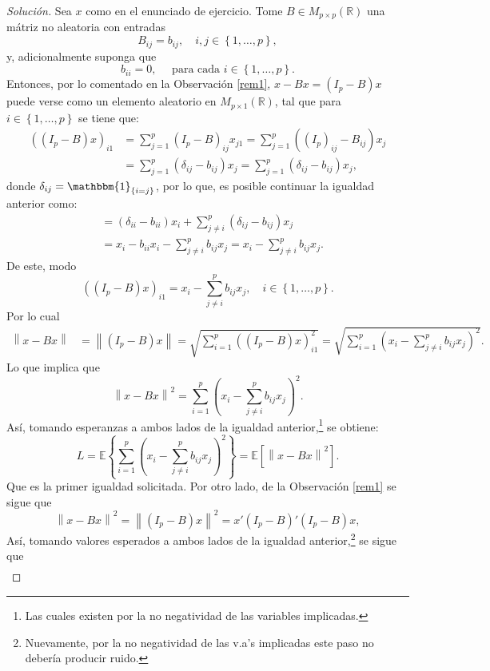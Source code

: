 \documentclass[10.5pt,notitlepage]{article}
\newenvironment{solucion}
  {\begin{proof}[Solución]}
  {\end{proof}}
\newcommand{\RR}{\mathbb{R}}
\newcommand{\EE}{\mathbb{E}}
\newcommand{\norm}[1]{\left\| #1 \right\|}
\newcommand{\kis}[1]{\left\{ #1 \right\}}
\newcommand{\pare}[1]{\left( #1 \right)}
\theoremstyle{plain}
\begin{document}
\begin{solucion}
Sea \(x\) como en el enunciado de ejercicio. Tome \(B \in M_{p \times p}(\RR)\) una mátriz no aleatoria con entradas 
\[B_{ij} = b_{ij},\quad i,j \in \kis{1, \hdots,p},\] 
y, adicionalmente suponga que 
\[
b_{ii} = 0, \quad \text{ para cada } i \in \kis{1, \hdots, p}. 
\]
Entonces, por lo comentado en la Observación \ref{rem1}, \(x - Bx = (I_{p} - B)x\) puede verse como un elemento aleatorio en \(M_{p\times 1}(\RR)\), tal que para \(i \in \kis{1, \hdots, p}\) se tiene que:  
\begin{align*}
    ((I_{p} - B)x)_{i1} &= \sum_{j = 1}^{p}(I_{p} - B)_{ij}x_{j1} = \sum_{j = 1}^{p}((I_{p})_{ij} - B_{ij})x_{j}\\
                        &= \sum_{j = 1}^{p}(\delta_{ij} - b_{ij})x_{j} = \sum_{j = 1}^{p}(\delta_{ij} - b_{ij})x_{j},
\end{align*}
donde \(\delta_{ij} = \mathbbm{1}_{\kis{i = j}}\), por lo que, es posible continuar la igualdad anterior como:
\begin{align*}
          &= (\delta_{ii} - b_{ii})x_{i} + \sum_{j \neq i}^{p}(\delta_{ij} - b_{ij})x_{j}\\ 
          &= x_{i}- b_{ii}x_{i} - \sum_{j \neq i}^{p} b_{ij}x_{j} =  x_{i} - \sum_{j \neq i}^{p} b_{ij}x_{j}.
\end{align*}
De este, modo 
\[
  ((I_{p} - B)x)_{i1} = x_{i} - \sum_{j \neq i}^{p} b_{ij}x_{j}, \quad i \in \kis{1, \hdots, p}. 
\]
Por lo cual 
\begin{align*}
   \norm{ x - Bx } &= \norm{ (I_{p}- B)x } = \sqrt{\sum_{i = 1}^{p}((I_{p} - B)x)_{i1}^2 }= \sqrt{\sum_{i = 1}^{p}\pare{x_{i} - \sum_{j \neq i}^{p} b_{ij}x_{j}}^2}.     
\end{align*}
Lo que implica que
\[
   \norm{ x - Bx }^2 = \sum_{i = 1}^{p}\pare{x_{i} - \sum_{j \neq i}^{p} b_{ij}x_{j}}^2. 
\]
Así, tomando esperanzas a ambos lados de la igualdad anterior,\footnote{Las cuales existen por la no negatividad de las variables implicadas.} se obtiene: 
\[
L = \EE\kis{ \sum_{i = 1}^{p}\pare{x_{i} - \sum_{j \neq i}^{p} b_{ij}x_{j}}^2 } = \EE[\norm{ x - Bx }^2].
\]
Que es la primer igualdad solicitada. Por otro lado, de la Observación \ref{rem1} se sigue que 
\[
\norm{ x - Bx }^2 = \norm{ (I_{p} - B)x }^2 = x'(I_{p} - B)'(I_{p}- B)x,
\]
Así, tomando valores esperados a ambos lados de la igualdad anterior,\footnote{Nuevamente, por la no negatividad de las v.a's implicadas este paso no debería producir ruido.} se sigue que 
\begin{align}\label{33}

\end{align}
\end{solucion}
\end{document}
